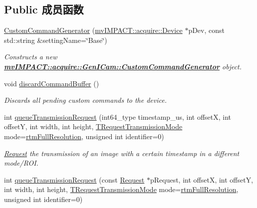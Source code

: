 \subsection*{Public 成员函数}
\begin{DoxyCompactItemize}
\item 
\hyperlink{classmv_i_m_p_a_c_t_1_1acquire_1_1_gen_i_cam_1_1_custom_command_generator_a1c085e44992c2cd2b0fe2c21682d8124}{Custom\+Command\+Generator} (\hyperlink{classmv_i_m_p_a_c_t_1_1acquire_1_1_device}{mv\+I\+M\+P\+A\+C\+T\+::acquire\+::\+Device} $\ast$p\+Dev, const std\+::string \&setting\+Name=\char`\"{}Base\char`\"{})
\begin{DoxyCompactList}\small\item\em Constructs a new {\bfseries \hyperlink{classmv_i_m_p_a_c_t_1_1acquire_1_1_gen_i_cam_1_1_custom_command_generator}{mv\+I\+M\+P\+A\+C\+T\+::acquire\+::\+Gen\+I\+Cam\+::\+Custom\+Command\+Generator}} object. \end{DoxyCompactList}\item 
void \hyperlink{classmv_i_m_p_a_c_t_1_1acquire_1_1_gen_i_cam_1_1_custom_command_generator_a315a0086cb96245fc4d481c0c7c65125}{discard\+Command\+Buffer} ()
\begin{DoxyCompactList}\small\item\em Discards all pending custom commands to the device. \end{DoxyCompactList}\item 
int \hyperlink{classmv_i_m_p_a_c_t_1_1acquire_1_1_gen_i_cam_1_1_custom_command_generator_a807c3f7b8eb9b6392035e97967116250}{queue\+Transmission\+Request} (int64\+\_\+type timestamp\+\_\+us, int offset\+X, int offset\+Y, int width, int height, \hyperlink{group___gen_i_cam_interface_ga5817a4e9c4ac30a320103ae1cec95cb9}{T\+Request\+Transmission\+Mode} mode=\hyperlink{group___gen_i_cam_interface_gga5817a4e9c4ac30a320103ae1cec95cb9aa8d28f2764e3f2869ec70d36a2ce2366}{rtm\+Full\+Resolution}, unsigned int identifier=0)
\begin{DoxyCompactList}\small\item\em \hyperlink{classmv_i_m_p_a_c_t_1_1acquire_1_1_request}{Request} the transmission of an image with a certain timestamp in a different mode/\+R\+O\+I. \end{DoxyCompactList}\item 
int \hyperlink{classmv_i_m_p_a_c_t_1_1acquire_1_1_gen_i_cam_1_1_custom_command_generator_af6e0f250f4bb08bfd83a3d4ec4f30776}{queue\+Transmission\+Request} (const \hyperlink{classmv_i_m_p_a_c_t_1_1acquire_1_1_request}{Request} $\ast$p\+Request, int offset\+X, int offset\+Y, int width, int height, \hyperlink{group___gen_i_cam_interface_ga5817a4e9c4ac30a320103ae1cec95cb9}{T\+Request\+Transmission\+Mode} mode=\hyperlink{group___gen_i_cam_interface_gga5817a4e9c4ac30a320103ae1cec95cb9aa8d28f2764e3f2869ec70d36a2ce2366}{rtm\+Full\+Resolution}, unsigned int identifier=0)

\end{DoxyCompactItemize}
